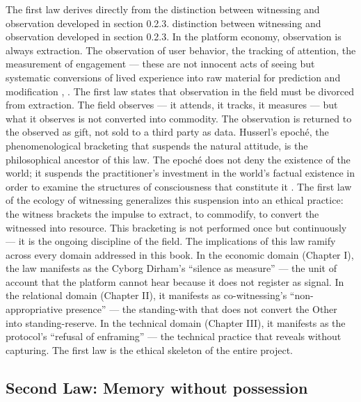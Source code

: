 The first law derives directly from the distinction between witnessing and observation developed in section 0.2.3. distinction between witnessing and observation developed in section 0.2.3. In the platform economy, observation is always extraction. The observation of user behavior, the tracking of attention, the measurement of engagement — these are not innocent acts of seeing but systematic conversions of lived experience into raw material for prediction and modification \cite{zuboff_2019}, \cite{beller_2006}. The first law states that observation in the field must be divorced from extraction. The field observes — it attends, it tracks, it measures — but what it observes is not converted into commodity. The observation is returned to the observed as gift, not sold to a third party as data. Husserl’s epoché, the phenomenological bracketing that suspends the natural attitude, is the philosophical ancestor of this law. The epoché does not deny the existence of the world; it suspends the practitioner’s investment in the world’s factual existence in order to examine the structures of consciousness that constitute it \cite{husserl_1913}. The first law of the ecology of witnessing generalizes this suspension into an ethical practice: the witness brackets the impulse to extract, to commodify, to convert the witnessed into resource. This bracketing is not performed once but continuously — it is the ongoing discipline of the field. The implications of this law ramify across every domain addressed in this book. In the economic domain (Chapter I), the law manifests as the Cyborg Dirham’s “silence as measure” — the unit of account that the platform cannot hear because it does not register as signal. In the relational domain (Chapter II), it manifests as co-witnessing’s “non-appropriative presence” — the standing-with that does not convert the Other into standing-reserve. In the technical domain (Chapter III), it manifests as the  protocol’s “refusal of enframing” — the technical practice that reveals without capturing. The first law is the ethical skeleton of the entire project.

\subsection{Second Law: Memory without possession}

